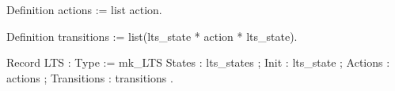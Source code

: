 Definition actions := list action.

Definition transitions := list(lts_state * action * lts_state).

Record LTS : Type := mk_LTS
  { States      : lts_states         ;
    Init        : lts_state          ;
    Actions     : actions            ;
    Transitions : transitions 
  }.